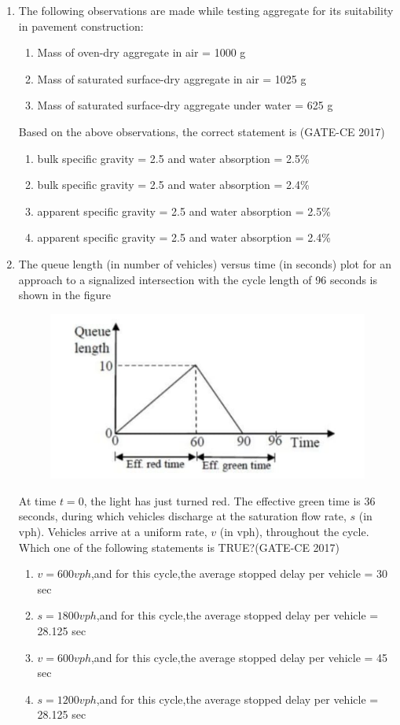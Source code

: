 \documentclass[journal,12pt,onecolumn]{article}
\theoremstyle{remark}
\begin{document}
\begin{enumerate}
    \item The following observations are made while testing aggregate for its suitability in pavement construction:
    \begin{enumerate}
        \item Mass of oven-dry aggregate in air = 1000 g
        \item Mass of saturated surface-dry aggregate in air = 1025 g
        \item Mass of saturated surface-dry aggregate under water = 625 g
    \end{enumerate}
    Based on the above observations, the correct statement is \underline{\hspace{3cm}}\hfill (GATE-CE 2017)
    \begin{enumerate}
        \item bulk specific gravity = 2.5 and water absorption = 2.5\%
        \item bulk specific gravity = 2.5 and water absorption = 2.4\%
        \item apparent specific gravity = 2.5 and water absorption = 2.5\%
        \item apparent specific gravity = 2.5 and water absorption = 2.4\%
    \end{enumerate}

    \item The queue length (in number of vehicles) versus time (in seconds) plot for an approach to a signalized intersection with the cycle length of 96 seconds is shown in the figure 
    \begin{figure}[H]
    \centering
    \includegraphics[width=0.7\columnwidth]{figs/imageq33.jpg}  
    \caption{}
    \label{fig:33}
    \end{figure}
    At time $t = 0$, the light has just turned red. The effective green time is 36 seconds, during which vehicles discharge at the saturation flow rate, $s$ (in vph). Vehicles arrive at a uniform rate, $v$ (in vph), throughout the cycle. Which one of the following statements is TRUE?\hfill (GATE-CE 2017)
    \begin{enumerate}
        \item $v = 600 vph$,and for this cycle,the average stopped delay per vehicle = 30 sec
        \item $s = 1800 vph$,and for this cycle,the average stopped delay per vehicle = 28.125 sec
        \item $v = 600 vph$,and for this cycle,the average stopped delay per vehicle = 45 sec
        \item $s = 1200 vph$,and for this cycle,the average stopped delay per vehicle = 28.125 sec
    \end{enumerate}


\end{enumerate}
\end{document}
